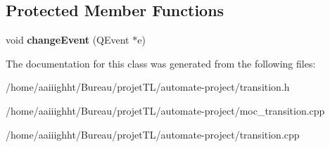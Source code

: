 \subsection*{Protected Member Functions}
\begin{DoxyCompactItemize}
\item 
\hypertarget{class_transition_a9df49098a20b28bd720e96d69255a026}{void {\bfseries change\-Event} (Q\-Event $\ast$e)}\label{class_transition_a9df49098a20b28bd720e96d69255a026}

\end{DoxyCompactItemize}


The documentation for this class was generated from the following files\-:\begin{DoxyCompactItemize}
\item 
/home/aaiiighht/\-Bureau/projet\-T\-L/automate-\/project/transition.\-h\item 
/home/aaiiighht/\-Bureau/projet\-T\-L/automate-\/project/moc\-\_\-transition.\-cpp\item 
/home/aaiiighht/\-Bureau/projet\-T\-L/automate-\/project/transition.\-cpp\end{DoxyCompactItemize}
